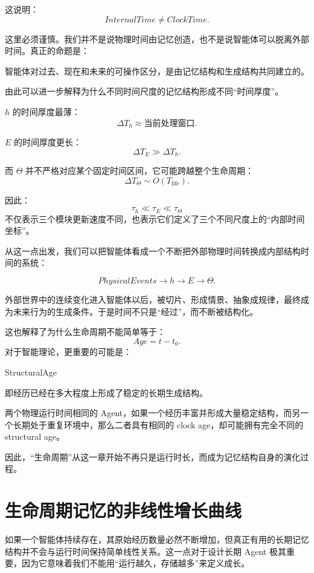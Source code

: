这说明：
\[
\boxed{
InternalTime
\neq
ClockTime.
}
\]

这里必须谨慎。我们并不是说物理时间由记忆创造，也不是说智能体可以脱离外部时间。真正的命题是：

\begin{proposition*}
智能体对过去、现在和未来的可操作区分，是由记忆结构和生成结构共同建立的。
\end{proposition*}

由此可以进一步解释为什么不同时间尺度的记忆结构形成不同“时间厚度”。

\(h\) 的时间厚度最薄：
\[
\Delta T_h\approx\text{当前处理窗口}.
\]

\(E\) 的时间厚度更长：
\[
\Delta T_E
\gg
\Delta T_h.
\]

而 \(\Theta\) 并不严格对应某个固定时间区间，它可能跨越整个生命周期：
\[
\Delta T_\Theta
\sim
O(T_{\mathrm{life}}).
\]

因此：
\[
\boxed{
\tau_h
\ll
\tau_E
\ll
\tau_\Theta
}
\]
不仅表示三个模块更新速度不同，也表示它们定义了三个不同尺度上的“内部时间坐标”。

从这一点出发，我们可以把智能体看成一个不断把外部物理时间转换成内部结构时间的系统：

\[
PhysicalEvents
\rightarrow
h
\rightarrow
E
\rightarrow
\Theta.
\]

外部世界中的连续变化进入智能体以后，被切片、形成情景、抽象成规律，最终成为未来行为的生成条件。于是时间不只是“经过”，而不断被结构化。

这也解释了为什么生命周期不能简单等于：
\[
Age=t-t_0.
\]
对于智能理论，更重要的可能是：
\begin{statementbox}
StructuralAge
\end{statementbox}
即经历已经在多大程度上形成了稳定的长期生成结构。

两个物理运行时间相同的 Agent，如果一个经历丰富并形成大量稳定结构，而另一个长期处于重复环境中，那么二者具有相同的 clock age，却可能拥有完全不同的 structural age。

因此，“生命周期”从这一章开始不再只是运行时长，而成为记忆结构自身的演化过程。

\section{生命周期记忆的非线性增长曲线}

如果一个智能体持续存在，其原始经历数量必然不断增加，但真正有用的长期记忆结构并不会与运行时间保持简单线性关系。这一点对于设计长期 Agent 极其重要，因为它意味着我们不能用“运行越久，存储越多”来定义成长。

